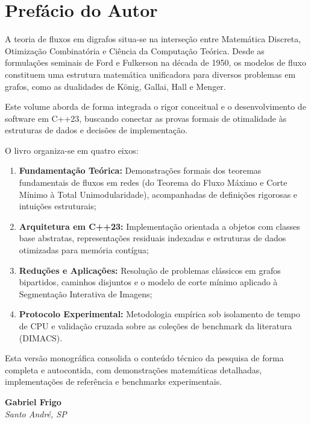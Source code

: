 \chapter*{Prefácio do Autor}

A teoria de fluxos em digrafos situa-se na interseção entre Matemática Discreta, Otimização Combinatória e Ciência da Computação Teórica. Desde as formulações seminais de Ford e Fulkerson na década de 1950, os modelos de fluxo constituem uma estrutura matemática unificadora para diversos problemas em grafos, como as dualidades de König, Gallai, Hall e Menger.

Este volume aborda de forma integrada o rigor conceitual e o desenvolvimento de software em C++23, buscando conectar as provas formais de otimalidade às estruturas de dados e decisões de implementação.

O livro organiza-se em quatro eixos:
\begin{enumerate}[leftmargin=1.5em, itemsep=0.4em]
    \item \textbf{Fundamentação Teórica:} Demonstrações formais dos teoremas fundamentais de fluxos em redes (do Teorema do Fluxo Máximo e Corte Mínimo à Total Unimodularidade), acompanhadas de definições rigorosas e intuições estruturais;
    \item \textbf{Arquitetura em C++23:} Implementação orientada a objetos com classes base abstratas, representações residuais indexadas e estruturas de dados otimizadas para memória contígua;
    \item \textbf{Reduções e Aplicações:} Resolução de problemas clássicos em grafos bipartidos, caminhos disjuntos e o modelo de corte mínimo aplicado à Segmentação Interativa de Imagens;
    \item \textbf{Protocolo Experimental:} Metodologia empírica sob isolamento de tempo de CPU e validação cruzada sobre as coleções de benchmark da literatura (DIMACS).
\end{enumerate}

Esta versão monográfica consolida o conteúdo técnico da pesquisa de forma completa e autocontida, com demonstrações matemáticas detalhadas, implementações de referência e benchmarks experimentais.

\vspace{1cm}
\begin{flushright}
    \textbf{Gabriel Frigo}\\
    \textit{Santo André, SP}
\end{flushright}

\newpage
\tableofcontents
\newpage

